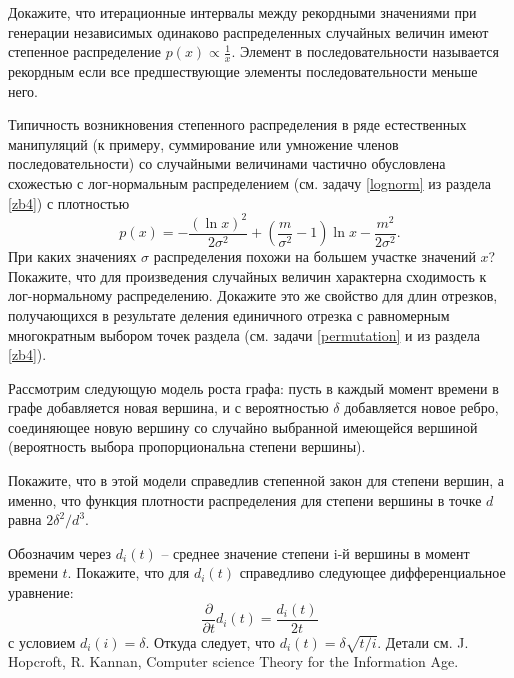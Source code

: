 \begin{problem}
Докажите, что итерационные интервалы между рекордными значениями при генерации независимых одинаково распределенных случайных величин имеют степенное распределение $p(x) \propto \frac{1}{x}.$ Элемент в последовательности называется  рекордным если все   предшествующие элементы последовательности меньше него.
\end{problem}

\begin{problem}
Типичность возникновения степенного распределения в ряде естественных манипуляций (к примеру, суммирование или умножение членов последовательности) со случайными величинами частично обусловлена схожестью с лог-нормальным распределением (см. задачу \ref{lognorm} из раздела \ref{zb4}) с плотностью
\[
p(x) = - \frac{(\ln x)^2}{2 \sigma^2} + \left( \frac{m}{\sigma^2} - 1 \right) \ln x  - \frac{m^2}{2 \sigma^2}.
\]    
При каких значениях $ \sigma$ распределения  похожи на большем участке значений $x$?
Покажите, что для произведения случайных величин характерна сходимость к лог-нормальному распределению. Докажите это же свойство для длин отрезков, получающихся в результате деления единичного отрезка с равномерным многократным выбором точек раздела (см. задачи \ref{permutation} и \label{permutation1} из раздела \ref{zb4}).     
\end{problem}


\begin{problem}
\label{prefattach}
Рассмотрим следующую модель роста графа: пусть в каждый момент времени в 
графе добавляется новая вершина, и с вероятностью $\delta $ добавляется новое 
ребро, соединяющее новую вершину со случайно выбранной имеющейся вершиной 
(вероятность выбора пропорциональна степени вершины).



Покажите, что в этой модели справедлив степенной закон для степени вершин, а 
именно, что функция плотности распределения для степени вершины в точке $d$ 
равна $2{\delta ^2/d^3}$.
\begin{remark}
Обозначим через $d_i (t)$ -- среднее значение степени i-й вершины в момент 
времени $t$. Покажите, что для $d_i (t)$ справедливо следующее 
дифференциальное уравнение:
\[
\frac{\partial }{\partial t}d_i (t)=\frac{d_i (t)}{2t}
\]
с условием $d_i (i)=\delta $. Откуда следует, что $d_i (t)=\delta \sqrt 
{t/i} $.
Детали см. J. Hopcroft, R. Kannan, Computer science Theory for the Information Age.
\end{remark}
\end{problem}


